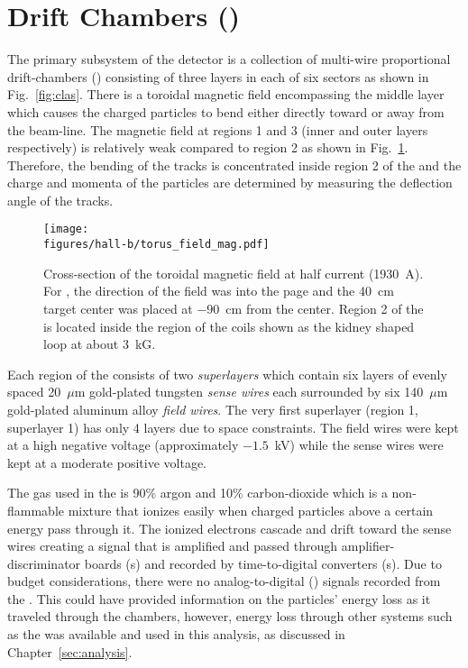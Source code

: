 \section{\label{sec:clas.dc}Drift Chambers ()}

The primary subsystem of the  detector is a collection of multi-wire proportional drift-chambers\cite{clas.dc} () consisting of three layers in each of six sectors as shown in Fig.~\ref{fig:clas}. There is a toroidal magnetic field encompassing the middle layer which causes the charged particles to bend either directly toward or away from the beam-line. The magnetic field at regions 1 and 3 (inner and outer layers respectively) is relatively weak compared to region 2 as shown in Fig.~\ref{fig:clas.dc.torus.mag}. Therefore, the bending of the tracks is concentrated inside region 2 of the  and the charge and momenta of the particles are determined by measuring the deflection angle of the tracks.

\begin{figure}\begin{center}
\texttt{[image: \\figures/hall-b/torus\_field\_mag.pdf]}
\caption[Magnetic Field Cross-sectional Magnitude]{\label{fig:clas.dc.torus.mag}Cross-section of the toroidal magnetic field at half current (1930~A). For , the direction of the field was into the page and the 40~cm target center was placed at $-90$~cm from the  center. Region 2 of the  is located inside the region of the coils shown as the kidney shaped loop at about 3~kG.}
\end{center}\end{figure}

Each region of the  consists of two \emph{superlayers} which contain six layers of evenly spaced 20~$\mu$m gold-plated tungsten \emph{sense wires} each surrounded by six 140~$\mu$m gold-plated aluminum alloy \emph{field wires}. The very first superlayer (region 1, superlayer 1) has only 4 layers due to space constraints. The field wires were kept at a high negative voltage (approximately $-1.5$~kV) while the sense wires were kept at a moderate positive voltage.

The gas used in the  is 90\% argon and 10\% carbon-dioxide which is a non-flammable mixture that ionizes easily when charged particles above a certain energy pass through it. The ionized electrons cascade and drift toward the sense wires creating a signal that is amplified and passed through amplifier-discriminator boards (s) and recorded by time-to-digital converters (s). Due to budget considerations, there were no analog-to-digital () signals recorded from the . This could have provided information on the particles' energy loss as it traveled through the chambers, however, energy loss through other systems such as the  was available and used in this analysis, as discussed in Chapter~\ref{sec:analysis}.


